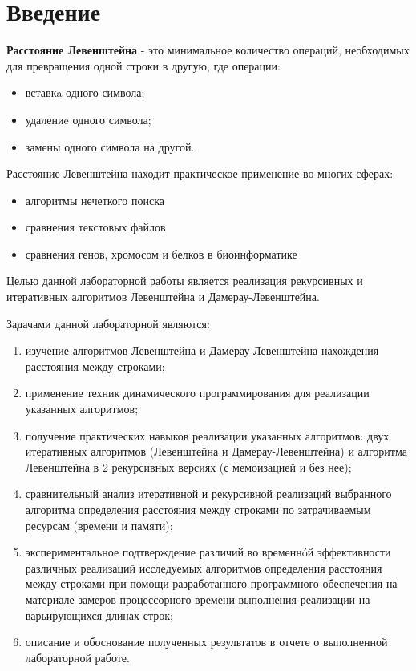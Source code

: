 \chapter*{Введение}
\textbf{Расстояние Левенштейна} - это минимальное количество операций, необходимых для превращения одной строки в другую, где операции:
\begin{itemize}
    \item вставкa одного символа; 
    \item удалениe одного символа;
    \item замены одного символа на другой.
\end{itemize}

Расстояние Левенштейна находит практическое применение во многих сферах:

\begin{itemize}
	\item алгоритмы нечеткого поиска
	\item сравнения текстовых файлов
	\item сравнения генов, хромосом и белков в биоинформатике
\end{itemize}

Целью данной лабораторной работы является реализация рекурсивных и итеративных алгоритмов Левенштейна и Дамерау-Левенштейна. 

Задачами данной лабораторной являются:
\begin{enumerate}
  	\item изучение алгоритмов Левенштейна и Дамерау-Левенштейна нахождения расстояния между строками;
	\item применение техник динамического программирования для реализации указанных алгоритмов; 
    \item получение практических навыков реализации указанных алгоритмов: двух итеративных алгоритмов (Левенштейна и Дамерау-Левенштейна) и алгоритма Левенштейна в 2 рекурсивных версиях (с мемоизацией и без нее); 
	\item сравнительный анализ итеративной и рекурсивной реализаций выбранного алгоритма определения расстояния между строками по затрачиваемым ресурсам (времени и памяти); 
	\item экспериментальное подтверждение различий во временнóй эффективности различных реализаций исследуемых алгоритмов определения расстояния между строками при помощи разработанного программного обеспечения на материале замеров процессорного времени выполнения реализации на варьирующихся длинах строк; 
	\item описание и обоснование полученных результатов в отчете о выполненной лабораторной работе. 
\end{enumerate}
